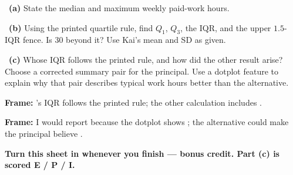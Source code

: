 \documentclass[11pt]{article}
\begin{document}
~\textbf{(a)} State the median and maximum weekly paid-work hours.\par
\workspace{0.7in}

~\textbf{(b)} Using the printed quartile rule, find $Q_1$, $Q_3$, the IQR, and the upper $1.5$-IQR fence. Is 30 beyond it? Use Kai's mean and SD as given.\par
\workspace{1.4in}

~\textbf{(c)} Whose IQR follows the printed rule, and how did the other result arise? Choose a corrected summary pair for the principal. Use a dotplot feature to explain why that pair describes typical work hours better than the alternative.\par
\workspace{2.0in}

\begin{sentenceframebox}\raggedright\textbf{Frame:} \blank[0.8in]'s IQR follows the printed rule; the other calculation includes \blank[1.6in].\end{sentenceframebox}

\begin{sentenceframebox}\raggedright\textbf{Frame:} I would report \blank[1.3in] because the dotplot shows \blank[2in]; the alternative could make the principal believe \blank[2.2in].\end{sentenceframebox}

\textbf{Turn this sheet in whenever you finish --- bonus credit. Part (c) is scored E / P / I.}\par
\end{document}
